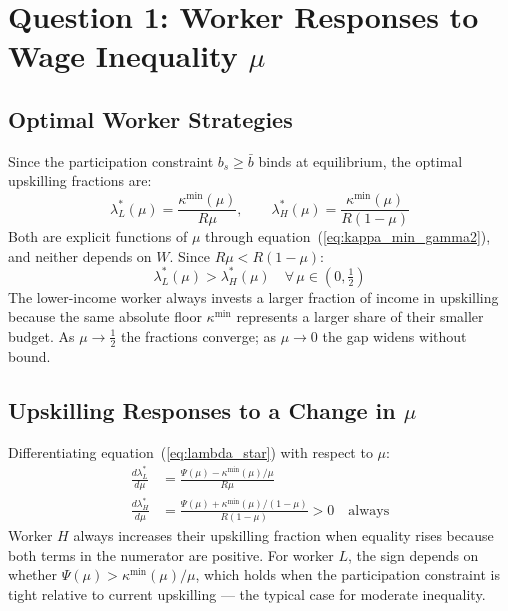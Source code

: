 \documentclass[12pt,a4paper]{article}
\begin{document}
\section{Question 1: Worker Responses to Wage Inequality $\mu$}
\label{sec:workers}

\subsection{Optimal Worker Strategies}

Since the participation constraint $b_s \geq \bar{b}$ binds at
equilibrium, the optimal upskilling fractions are:
\begin{equation}
  \lambda_L^*(\mu) = \frac{\kappa^{\min}(\mu)}{R\mu},
  \qquad
  \lambda_H^*(\mu) = \frac{\kappa^{\min}(\mu)}{R(1-\mu)}
  \label{eq:lambda_star}
\end{equation}
Both are explicit functions of $\mu$ through
equation~(\ref{eq:kappa_min_gamma2}), and neither depends on $W$. Since
$R\mu < R(1-\mu)$:
\begin{equation}
  \lambda_L^*(\mu) > \lambda_H^*(\mu) \quad
  \forall\,\mu \in \left(0,\tfrac{1}{2}\right)
  \label{eq:lambda_ordering}
\end{equation}
The lower-income worker always invests a larger fraction of income in
upskilling because the same absolute floor $\kappa^{\min}$ represents a
larger share of their smaller budget. As $\mu \to \tfrac{1}{2}$ the
fractions converge; as $\mu \to 0$ the gap widens without bound.

\subsection{Upskilling Responses to a Change in $\mu$}

Differentiating equation~(\ref{eq:lambda_star}) with respect to $\mu$:
\begin{align}
  \frac{d\lambda_L^*}{d\mu}
  &= \frac{\Psi(\mu) - \kappa^{\min}(\mu)/\mu}{R\mu}
  \label{eq:dlL_dmu} \\[6pt]
  \frac{d\lambda_H^*}{d\mu}
  &= \frac{\Psi(\mu) + \kappa^{\min}(\mu)/(1-\mu)}{R(1-\mu)}
  > 0 \quad \text{always}
  \label{eq:dlH_dmu}
\end{align}
Worker $H$ always increases their upskilling fraction when equality
rises because both terms in the numerator are positive. For worker $L$,
the sign depends on whether $\Psi(\mu) > \kappa^{\min}(\mu)/\mu$, which
holds when the participation constraint is tight relative to current
upskilling --- the typical case for moderate inequality.
\end{document}
